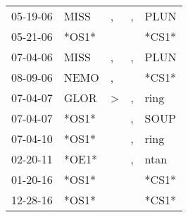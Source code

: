 \begin{supertabular}{lllll}
 05-19-06 &   MISS &             , &  , &   PLUN \\
 05-21-06 &  *OS1* &               &    &  *CS1* \\
 07-04-06 &   MISS &             , &  , &   PLUN \\
 08-09-06 &   NEMO &             , &    &  *CS1* \\
 07-04-07 &   GLOR &  \textgreater &  , &   ring \\
 07-04-07 &  *OS1* &               &  , &   SOUP \\
 07-04-10 &  *OS1* &               &  , &   ring \\
 02-20-11 &  *OE1* &               &  , &   ntan \\
 01-20-16 &  *OS1* &               &    &  *CS1* \\
 12-28-16 &  *OS1* &               &    &  *CS1* \\
\end{supertabular}
